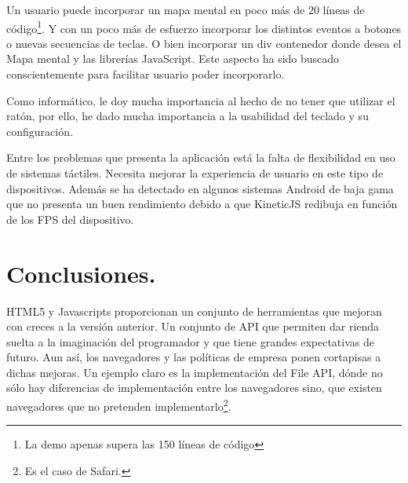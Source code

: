 Un usuario puede incorporar un mapa mental en poco más de 20 líneas de código\footnote{La demo apenas supera las 150 líneas de código}. Y con un poco más de esfuerzo incorporar los distintos eventos a botones o nuevas secuencias de teclas. O bien incorporar un div contenedor donde desea el Mapa mental y las librerías JavaScript. Este aspecto ha sido buscado conscientemente para facilitar usuario poder incorporarlo. 



Como informático, le doy mucha importancia al hecho de no tener que utilizar el ratón, por ello, he dado mucha importancia a la usabilidad del teclado y su configuración. 

Entre los problemas que presenta la aplicación está la falta de flexibilidad en uso de sistemas táctiles. Necesita mejorar la experiencia de usuario en este tipo de dispositivos. Además se ha detectado en algunos sistemas Android de baja gama que no presenta un buen rendimiento debido a que KineticJS redibuja en función de los FPS del dispositivo. 

\section{Conclusiones.}

HTML5 y Javascripts proporcionan un conjunto de herramientas que mejoran con creces a la versión anterior. Un conjunto de API que permiten dar rienda suelta a la imaginación del programador y que tiene grandes expectativas de futuro. Aun así, los navegadores y las políticas de empresa ponen cortapisas a dichas mejoras. Un ejemplo claro es la implementación del File API, dónde no sólo hay diferencias de implementación entre los navegadores sino, que existen navegadores que no pretenden implementarlo\footnote{Es el caso de Safari.}.

